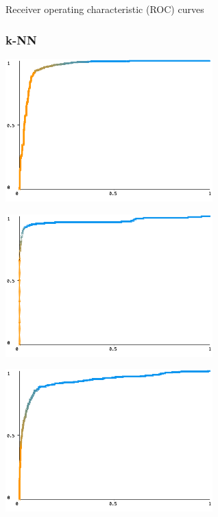\documentclass[12pt]{article}
\begin{document}
\begin{section}{Receiver operating characteristic (ROC) curves}
 \subsubsection{k-NN}

 \begin{center}
     \begin{minipage}{0.48\linewidth}
         \includegraphics[width=8cm]{images/3_1_knn_normal.png}
     \end{minipage}
     \begin{minipage}{0.48\linewidth}
         \includegraphics[width=8cm]{images/3_1_knn_pathological.png}
     \end{minipage}
     \begin{minipage}{0.48\linewidth}
         \includegraphics[width=8cm]{images/3_1_knn_suspect.png}
     \end{minipage}
 \end{center}


\end{section}
\end{document}
